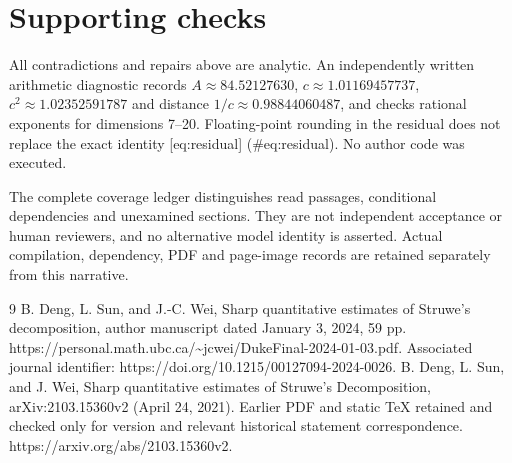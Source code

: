 \documentclass[10pt]{article}
\begin{document}
\section*{Supporting checks}
All contradictions and repairs above are analytic. An independently written arithmetic diagnostic records \(A\approx84.52127630\), \(c\approx1.01169457737\), \(c^2\approx1.02352591787\) and distance \(1/c\approx0.98844060487\), and checks rational exponents for dimensions 7–20. Floating-point rounding in the residual does not replace the exact identity [eq:residual] (\#eq:residual). No author code was executed.\par
The complete coverage ledger distinguishes read passages, conditional dependencies and unexamined sections. They are not independent acceptance or human reviewers, and no alternative model identity is asserted. Actual compilation, dependency, PDF and page-image records are retained separately from this narrative.\par
9 B. Deng, L. Sun, and J.-C. Wei, Sharp quantitative estimates of Struwe’s decomposition, author manuscript dated January 3, 2024, 59 pp. https://personal.math.ubc.ca/\textasciitilde{}jcwei/DukeFinal-2024-01-03.pdf. Associated journal identifier: https://doi.org/10.1215/00127094-2024-0026. B. Deng, L. Sun, and J. Wei, Sharp quantitative estimates of Struwe’s Decomposition, arXiv:2103.15360v2 (April 24, 2021). Earlier PDF and static TeX retained and checked only for version and relevant historical statement correspondence. https://arxiv.org/abs/2103.15360v2.\par
\end{document}
